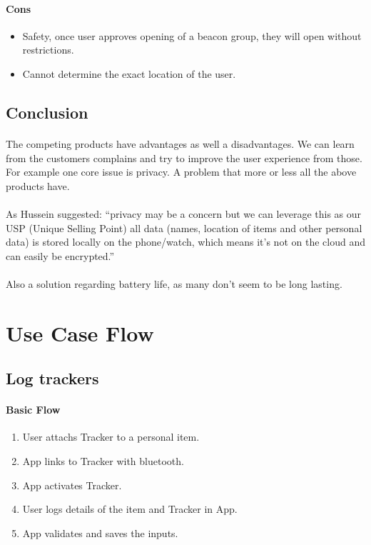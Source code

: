 \documentclass[12pt,a4paper]{article}
\begin{document}
\begin{appendices}
          \paragraph{Cons} 
            \begin{itemize}
              \item Safety, once user approves opening of a beacon group, they will open without restrictions.
              \item Cannot determine the exact location of the user.
            \end{itemize}
        \subsection{Conclusion}
          \paragraph{}
            The competing products have advantages as well a disadvantages. We can learn from the customers complains and try to improve the user experience from those. For example one core issue is privacy. A problem that more or less all the above products have.
          \paragraph{}
            As Hussein suggested: “privacy may be a concern but we can leverage this as our USP (Unique Selling Point) all data (names, location of items and other personal data) is stored locally on the phone/watch, which means it’s not on the cloud and can easily be encrypted.”
          \paragraph{}
            Also a solution regarding battery life, as many don’t seem to be long lasting.

      \section{Use Case Flow}
      \label{appendix:use-case-flow}
        \subsection{Log trackers}
          \paragraph{Basic Flow}
          \begin{enumerate}
            \item User attachs Tracker to a personal item.
            \item App links to Tracker with bluetooth.
            \item App activates Tracker.
            \item User logs details of the item and Tracker in App.
            \item App validates and saves the inputs.
          \end{enumerate}
        

\end{appendices}
\end{document}
